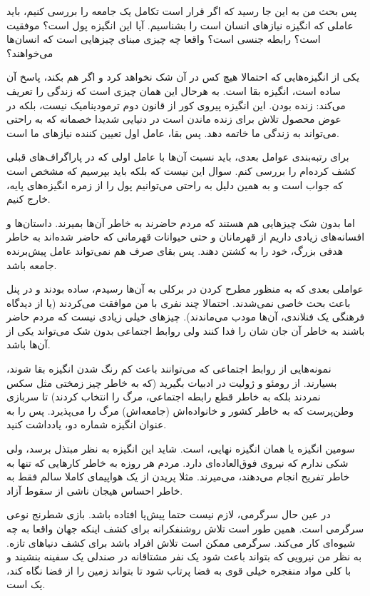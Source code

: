 پس بحث من به این جا رسید که اگر قرار است تکامل یک جامعه را بررسی کنیم،
باید عاملی که انگیزه نیازهای انسان است را بشناسیم. آیا این انگیزه پول
است؟ موفقیت است؟ رابطه جنسی است؟ واقعا چه چیزی مبنای چیزهایی است که
انسان‌ها می‌خواهند؟

یکی از انگیزه‌هایی که احتمالا هیچ کس در آن شک نخواهد کرد و اگر هم بکند،
پاسخ آن ساده است، انگیزه بقا است. به هرحال این همان چیزی است که زندگی
را تعریف می‌کند: زنده بودن. این انگیزه پیروی کور از قانون دوم
ترمودینامیک نیست، بلکه در عوض محصول تلاش برای زنده ماندن است در دنیایی
شدیدا خصمانه که به راحتی می‌تواند به زندگی ما خاتمه دهد. پس بقا، عامل
اول تعیین کننده نیازهای ما است.

برای رتبه‌بندی عوامل بعدی،‌ باید نسبت آن‌ها با عامل اولی که در
پاراگراف‌های قبلی کشف کرده‌ام را بررسی کنم. سوال این نیست که
 بلکه باید بپرسیم که
 مشخص است که جواب 
است و به همین دلیل به راحتی می‌توانیم پول را از زمره انگیزه‌های پایه‌،
خارج کنیم.

اما بدون شک چیزهایی هم هستند که مردم حاضرند به خاطر آن‌ها
بمیرند. داستان‌ها و افسانه‌های زیادی داریم از قهرمانان و حتی حیوانات
قهرمانی که حاضر شده‌اند به خاطر هدفی بزرگ، خود را به کشتن دهند. پس بقای
صرف هم نمی‌تواند عامل پیش‌برنده جامعه باشد.

عواملی بعدی که به منظور مطرح کردن در برکلی به آن‌ها رسیدم، ساده بودند و
در پنل باعث بحث خاصی نمی‌شدند. احتمالا چند نفری با من موافقت می‌کردند
(یا از دیدگاه فرهنگی یک فنلاندی، آن‌ها مودب می‌ماندند). چیزهای خیلی
زیادی نیست که مردم حاضر باشند به خاطر آن جان شان را فدا کنند ولی روابط
اجتماعی بدون شک می‌تواند یکی از آن‌ها باشد.

نمونه‌هایی از روابط اجتماعی که می‌توانند باعث کم رنگ شدن انگیزه بقا
شوند، بسیارند. از رومئو و ژولیت در ادبیات بگیرید (که به خاطر چیز زمختی
مثل سکس نمردند بلکه به خاطر قطع رابطه اجتماعی، مرگ را انتخاب کردند) تا
سربازی وطن‌پرست که به خاطر کشور و خانواده‌اش (جامعه‌اش) مرگ را
می‌پذیرد. پس  را به عنوان انگیزه شماره دو،
یادداشت کنید.

سومین انگیزه یا همان انگیزه نهایی،  است. شاید این
انگیزه به نظر مبتذل برسد، ولی شکی ندارم که نیروی فوق‌العاده‌ای
دارد. مردم هر روزه به خاطر کارهایی که تنها به خاطر تفریح انجام می‌دهند،
می‌میرند. مثلا پریدن از یک هواپیمای کاملا سالم فقط به خاطر احساس هیجان
ناشی از سقوط آزاد.

در عین حال سرگرمی، لازم نیست حتما پیش‌پا افتاده باشد. بازی شطرنج نوعی
سرگرمی است. همین طور است تلاش روشنفکرانه برای کشف اینکه جهان واقعا به
چه شیوه‌ای کار می‌کند. سرگرمی ممکن است تلاش افراد باشد برای کشف دنیاهای
تازه. به نظر من نیرویی که بتواند باعث شود یک نفر مشتاقانه در صندلی یک
سفینه بنشیند و با کلی مواد منفجره خیلی قوی به فضا پرتاب شود تا بتواند
زمین را از فضا نگاه کند، یک  است.

